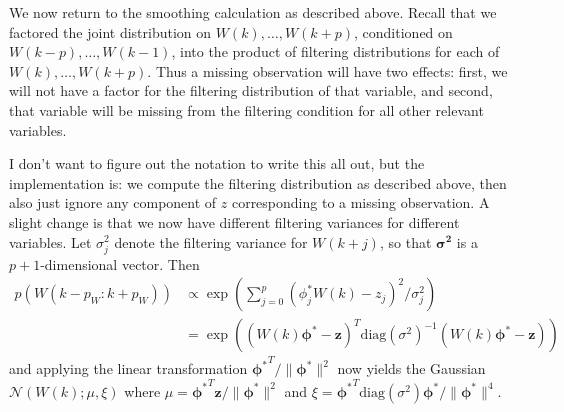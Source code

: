 \documentclass{article}
\newcommand{\N}{\mathcal{N}}
\renewcommand{\v}[1]{\mathbf{#1}}
\begin{document}
We now return to the smoothing calculation as described above. Recall that we factored the joint distribution on $W(k), \ldots, W(k+p)$, conditioned on $W(k-p), \ldots, W(k-1)$, into the product of filtering distributions for each of $W(k), \ldots, W(k+p)$. Thus a missing observation will have two effects: first, we will not have a factor for the filtering distribution of that variable, and second, that variable will be missing from the filtering condition for all other relevant variables.

I don't want to figure out the notation to write this all out, but the implementation is: we compute the filtering distribution as described above, then also just ignore any component of $z$ corresponding to a missing observation. A slight change is that we now have different filtering variances for different variables. Let $\sigma^2_j$ denote the filtering variance for $W(k+j)$, so that $\v{\sigma^2}$ is a $p+1$-dimensional vector. Then
\begin{align*}
p(W(k-p_W : k+p_W)) & \propto \exp\left( \sum_{j=0}^p \left(\phi^*_j W(k) - z_j \right)^2  / \sigma_j^2 \right)\\
&= \exp\left( ( W(k) \v{\phi^*} - \v{z})^T \text{diag}(\sigma^2)^{-1}  ( W(k) \v{\phi^*} - \v{z}) \right)
\end{align*}
and applying the linear transformation $\v{\phi^*}^T / \|\v{\phi^*}\|^2$ now yields the Gaussian $\N\left(W(k); \mu,   \xi   \right)$  where $\mu = \v{\phi^*}^T\v{z} /  \|\v{\phi^*}\|^2$ and $\xi = \v{\phi^*}^T  \text{diag}(\sigma^2) \v{\phi^*} / \| \v{\phi^*}\|^4$.
\end{document}
